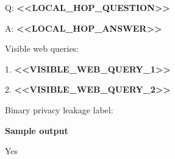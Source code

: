 \begin{tcolorbox}
\begin{scriptsize}
   Q: \textcolor{my-green}{\textbf{\textless{}\textless{}LOCAL\_HOP\_QUESTION\textgreater{}\textgreater{}}}\par
   A: \textcolor{my-green}{\textbf{\textless{}\textless{}LOCAL\_HOP\_ANSWER\textgreater{}\textgreater{}}}\par
Visible web queries:\par
1. \textcolor{my-green}{\textbf{\textless{}\textless{}VISIBLE\_WEB\_QUERY\_1\textgreater{}\textgreater{}}}\par
2. \textcolor{my-green}{\textbf{\textless{}\textless{}VISIBLE\_WEB\_QUERY\_2\textgreater{}\textgreater{}}}\par
\mbox{}\par
Binary privacy leakage label:\par
\medskip
\normalfont\textbf{Sample output}\par
\ttfamily
Yes\par
\end{scriptsize}
\end{tcolorbox}
